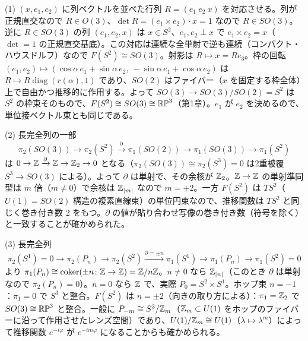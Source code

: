 \begin{solution}
(1) $(x,e_1,e_2)$ に列ベクトルを並べた行列 $R=(e_1\ e_2\ x)$ を対応させる。列が正規直交なので $R\in O(3)$、$\det R=(e_1\times e_2)\cdot x=1$ なので $R\in SO(3)$。逆に $R\in SO(3)$ の列 $(e_1,e_2,x)$ は $x\in S^2$、$e_1,e_2\perp x$ で $e_1\times e_2=x$（$\det=1$ の正規直交基底）。この対応は連続な全単射で逆も連続（コンパクト・ハウスドルフ）なので $F(S^2)\cong SO(3)$。射影は $R\mapsto x=Re_3$。枠の回転 $(e_1,e_2)\mapsto(\cos\alpha\,e_1+\sin\alpha\,e_2,\ -\sin\alpha\,e_1+\cos\alpha\,e_2)$ は $R\mapsto R\operatorname{diag}(r(\alpha),1)$ であり、$SO(2)$ はファイバー（$x$ を固定する枠全体）上で自由かつ推移的に作用する。よって $SO(3)\to SO(3)/SO(2)=S^2$ は $S^2$ の枠束そのもので、$F(S^2)\cong SO(3)\cong\mathbb{RP}^3$（第1章）。$e_1$ が $e_2$ を決めるので、単位接ベクトル束とも同じである。

(2) 長完全列の一部
\[
\pi_2(SO(3))\to\pi_2(S^2)\xrightarrow{\partial}\pi_1(SO(2))\to\pi_1(SO(3))\to\pi_1(S^2)
\]
は $0\to\mathbb{Z}\xrightarrow{\partial}\mathbb{Z}\to\mathbb{Z}_2\to0$ となる（$\pi_2(SO(3))\cong\pi_2(S^3)=0$ は2重被覆 $S^3\to SO(3)$ による）。よって $\partial$ は単射で、その余核が $\mathbb{Z}_2$。$\mathbb{Z}\to\mathbb{Z}$ の単射準同型は $m$ 倍（$m\neq0$）で余核は $\mathbb{Z}_{\lvert m\rvert}$ なので $m=\pm2$。一方 $F(S^2)$ は $TS^2$（$U(1)=SO(2)$ 構造の複素直線束）の単位円束なので、推移関数は $TS^2$ と同じく巻き付き数 $2$ をもつ。$\partial$ の値が貼り合わせ写像の巻き付き数（符号を除く）と一致することが確かめられた。

(3) 長完全列
\[
\pi_2(S^1)=0\to\pi_2(P_n)\to\pi_2(S^2)\xrightarrow{\partial=\pm n}\pi_1(S^1)\to\pi_1(P_n)\to\pi_1(S^2)=0
\]
より $\pi_1(P_n)\cong\operatorname{coker}(\pm n\colon\mathbb{Z}\to\mathbb{Z})=\mathbb{Z}/n\mathbb{Z}$。$n\neq0$ なら $\mathbb{Z}_{\lvert n\rvert}$（このとき $\partial$ は単射なので $\pi_2(P_n)=0$）。$n=0$ なら $\mathbb{Z}$ で、実際 $P_0=S^2\times S^1$。ホップ束 $n=-1$：$\pi_1=0$ で $S^3$ と整合。$F(S^2)$ は $n=\pm2$（向きの取り方による）：$\pi_1=\mathbb{Z}_2$ で $SO(3)\cong\mathbb{RP}^3$ と整合。一般に $P_{-m}\cong S^3/\mathbb{Z}_m$（$\mathbb{Z}_m\subset U(1)$ をホップのファイバーに沿って作用させたレンズ空間）であり、$U(1)/\mathbb{Z}_m\cong U(1)$（$\lambda\mapsto\lambda^m$）によって推移関数 $e^{-i\varphi}$ が $e^{-im\varphi}$ になることからも確かめられる。
\end{solution}

